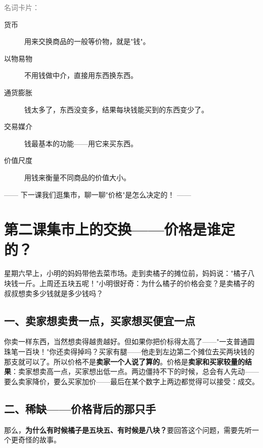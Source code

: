 \documentclass[a4paper,12pt]{ctexart}
\begin{document}
\vspace{0.3cm}
{\small\textcolor{gray}{名词卡片：}}\par
\begin{description}
  \item[\textbullet 货币] 用来交换商品的一般等价物，就是"钱"。
  \item[\textbullet 以物易物] 不用钱做中介，直接用东西换东西。
  \item[\textbullet 通货膨胀] 钱太多了，东西没变多，结果每块钱能买到的东西变少了。
  \item[\textbullet 交易媒介] 钱最基本的功能——用它来买东西。
  \item[\textbullet 价值尺度] 用钱来衡量不同商品的价值大小。
\end{description}

\vspace{0.5cm}
\begin{center}
\textcolor{blue!70!black}{\large —— 下一课我们逛集市，聊一聊"价格"是怎么决定的！ ——}
\end{center}

\newpage
\section{\textcolor{orange!80!black}{第二课\quad 集市上的交换——价格是谁定的？}}

星期六早上，小明的妈妈带他去菜市场。走到卖橘子的摊位前，妈妈说："橘子八块钱一斤。上周还五块五呢！"小明很好奇：为什么橘子的价格会变？是卖橘子的叔叔想卖多少钱就是多少钱吗？

\subsection*{一、卖家想卖贵一点，买家想买便宜一点}

你卖一样东西，当然想卖得越贵越好。但如果你把价标得太高了——"一支普通圆珠笔一百块！"你还卖得掉吗？买家有腿——他走到左边第二个摊位去买两块钱的那支就可以了。所以价格不是\textbf{卖家一个人说了算的}。价格是\textbf{卖家和买家较量的结果}：卖家想卖高一点，买家想出低一点。两边僵持不下的时候，总会有人先动——要么卖家降价，要么买家加价——最后在某个数字上两边都觉得可以接受：成交。

\subsection*{二、稀缺——价格背后的那只手}

那么，\textbf{为什么有时候橘子是五块五、有时候是八块？}要回答这个问题，需要先听一个更奇怪的故事。
\end{document}
